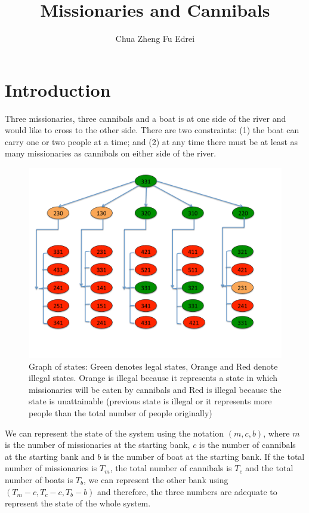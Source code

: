\documentclass[9.5pt]{extarticle}
\title{Missionaries and Cannibals}
\author{Chua Zheng Fu Edrei}
\begin{document}
\maketitle

\section{Introduction}

Three missionaries, three cannibals and a boat is at one side of the river and would like to cross to the other side. There are two constraints: (1) the boat can carry one or two people at a time; and (2) at any time there must be at least as many missionaries as cannibals on either side of the river.

\begin{figure}[H]
\centering
\includegraphics[scale=0.4]{stategraph.pdf}
\caption{Graph of states: Green denotes legal states, Orange and Red denote illegal states. Orange is illegal because it represents a state in which missionaries will be eaten by cannibals and Red is illegal because the state is unattainable (previous state is illegal or it represents more people than the total number of people originally) }
\label{Figure 1}
\end{figure}

We can represent the state of the system using the notation $(m,c,b)$, where $m$ is the number of missionaries at the starting bank, $c$ is the number of cannibals at the starting bank and $b$ is the number of boat at the starting bank. If the total number of missionaries is $T_m$, the total number of cannibals is $T_c$ and the total number of boats is $T_b$, we can represent the other bank using $(T_m-c,T_c-c, T_b-b)$ and therefore, the three numbers are adequate to represent the state of the whole system.\\
\end{document}
